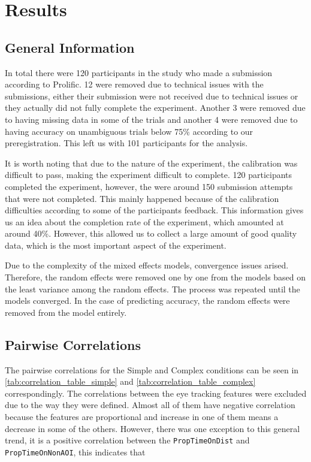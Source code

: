 ﻿\chapter{Results}
\label{chap:results}

\section{General Information}
\label{sec:general_info}
In total there were 120 participants in the study who made a submission according to Prolific. 12 were removed due to technical issues with the submissions, either their submission were not received due to technical issues or they actually did not fully complete the experiment. Another 3 were removed due to having missing data in some of the trials and another 4 were removed due to having accuracy on unambiguous trials below 75\% according to our preregistration. This left us with 101 participants for the analysis. 

It is worth noting that due to the nature of the experiment, the calibration was difficult to pass, making the experiment difficult to complete. 120 participants completed the experiment, however, the were around 150 submission attempts that were not completed. This mainly happened because of the calibration difficulties according to some of the participants feedback. This information gives us an idea about the completion rate of the experiment, which amounted at around 40\%. However, this allowed us to collect a large amount of good quality data, which is the most important aspect of the experiment.

Due to the complexity of the mixed effects models, convergence issues arised. Therefore, the random effects were removed one by one from the models based on the least variance among the random effects. The process was repeated until the models converged. In the case of predicting accuracy, the random effects were removed from the model entirely. 

\section{Pairwise Correlations}
\label{sec:pairwise_corr}

The pairwise correlations for the Simple and Complex conditions can be seen in \autoref{tab:correlation_table_simple} and \autoref{tab:correlation_table_complex} correspondingly. The correlations between the eye tracking features were excluded due to the way they were defined. Almost all of them have negative correlation because the features are proportional and increase in one of them means a decrease in some of the others. However, there was one exception to this general trend, it is a positive correlation between the \texttt{PropTimeOnDist} and \texttt{PropTimeOnNonAOI}, this indicates that 

